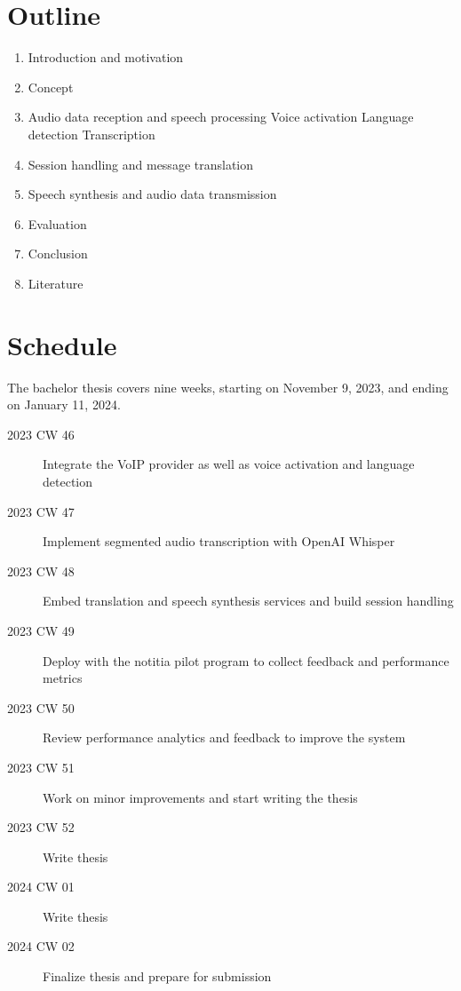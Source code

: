 \documentclass[a4paper,10pt]{article}
\begin{document}
\section{Outline}
\begin{enumerate}
  \item Introduction and motivation
  \item Concept
  \item Audio data reception and speech processing
  \subitem Voice activation
  \subitem Language detection
  \subitem Transcription
  \item Session handling and message translation
  \item Speech synthesis and audio data transmission
  \item Evaluation
  \item Conclusion
  \item Literature
\end{enumerate}


\section{Schedule}
The bachelor thesis covers nine weeks, starting on November 9, 2023, and ending on January 11, 2024.
\begin{description}
  \item[2023 CW 46] Integrate the VoIP provider as well as voice activation and language detection
  \item[2023 CW 47] Implement segmented audio transcription with OpenAI Whisper
  \item[2023 CW 48] Embed translation and speech synthesis services and build session handling
  \item[2023 CW 49] Deploy with the notitia pilot program to collect feedback and performance metrics
  \item[2023 CW 50] Review performance analytics and feedback to improve the system
  \item[2023 CW 51] Work on minor improvements and start writing the thesis
  \item[2023 CW 52] Write thesis
  \item[2024 CW 01] Write thesis
  \item[2024 CW 02] Finalize thesis and prepare for submission
\end{description}


% 
% 
\end{document}
